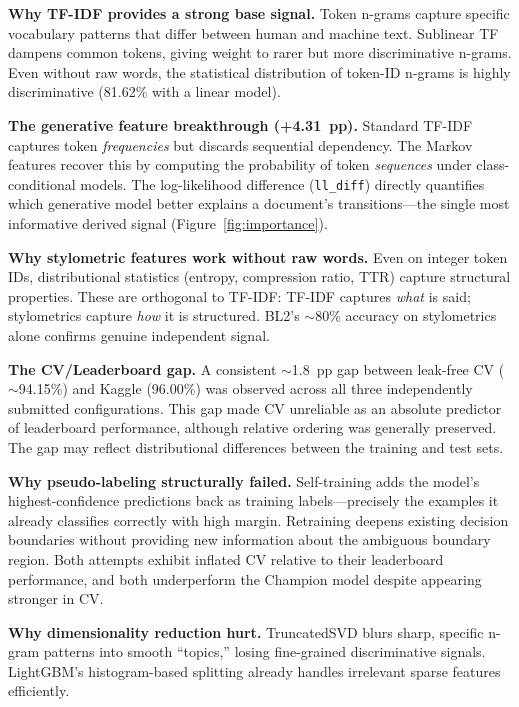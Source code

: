 \documentclass[11pt]{article}
\begin{document}
\textbf{Why TF-IDF provides a strong base signal.}
Token n-grams capture specific vocabulary patterns that differ between human and machine text. Sublinear TF dampens common tokens, giving weight to rarer but more discriminative n-grams. Even without raw words, the statistical distribution of token-ID n-grams is highly discriminative (81.62\% with a linear model).

\textbf{The generative feature breakthrough (+4.31~pp).}
Standard TF-IDF captures token \textit{frequencies} but discards sequential dependency. The Markov features recover this by computing the probability of token \textit{sequences} under class-conditional models. The log-likelihood difference (\texttt{ll\_diff}) directly quantifies which generative model better explains a document's transitions---the single most informative derived signal (Figure~\ref{fig:importance}).

\textbf{Why stylometric features work without raw words.}
Even on integer token IDs, distributional statistics (entropy, compression ratio, TTR) capture structural properties. These are orthogonal to TF-IDF: TF-IDF captures \textit{what} is said; stylometrics capture \textit{how} it is structured. BL2's ${\sim}$80\% accuracy on stylometrics alone confirms genuine independent signal.

\textbf{The CV/Leaderboard gap.}
A consistent ${\sim}$1.8~pp gap between leak-free CV (${\sim}$94.15\%) and Kaggle (96.00\%) was observed across all three independently submitted configurations. This gap made CV unreliable as an absolute predictor of leaderboard performance, although relative ordering was generally preserved. The gap may reflect distributional differences between the training and test sets.

\textbf{Why pseudo-labeling structurally failed.}
Self-training adds the model's highest-confidence predictions back as training labels---precisely the examples it already classifies correctly with high margin. Retraining deepens existing decision boundaries without providing new information about the ambiguous boundary region. Both attempts exhibit inflated CV relative to their leaderboard performance, and both underperform the Champion model despite appearing stronger in CV.

\textbf{Why dimensionality reduction hurt.}
TruncatedSVD blurs sharp, specific n-gram patterns into smooth ``topics,'' losing fine-grained discriminative signals. LightGBM's histogram-based splitting already handles irrelevant sparse features efficiently.
\end{document}

